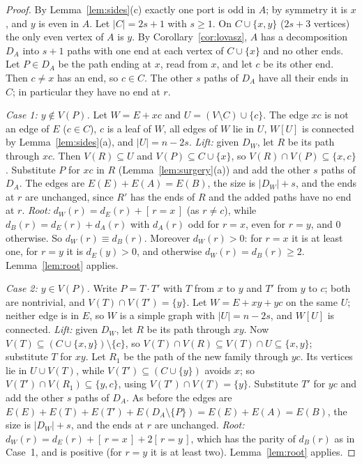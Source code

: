 \documentclass[11pt]{amsart}
\theoremstyle{definition}
\theoremstyle{remark}
\renewcommand{\_}{\oldunderscore\allowbreak}
\newcommand{\ind}[1]{[\,#1\,]}
\begin{document}
\begin{proof}
By Lemma~\ref{lem:sides}(c) exactly one port is odd in $A$; by symmetry it is $x$, and $y$ is even
in $A$. Let $|C|=2s+1$ with $s\ge1$. On $C\cup\{x,y\}$ ($2s+3$ vertices) the only even vertex of $A$
is $y$. By Corollary~\ref{cor:lovasz}, $A$ has a decomposition $D_A$ into $s+1$ paths with one end at
each vertex of $C\cup\{x\}$ and no other ends. Let $P\in D_A$ be the path ending at $x$, read from
$x$, and let $c$ be its other end. Then $c\ne x$ has an end, so $c\in C$. The other $s$ paths of
$D_A$ have all their ends in $C$; in particular they have no end at $r$.

\emph{Case 1: $y\notin V(P)$.} Let $W=E+xc$ and $U=(V\setminus C)\cup\{c\}$. The edge $xc$ is not an
edge of $E$ ($c\in C$), $c$ is a leaf of $W$, all edges of $W$ lie in $U$, $W[U]$ is connected by
Lemma~\ref{lem:sides}(a), and $|U|=n-2s$. \emph{Lift:} given $D_W$, let $R$ be its path through
$xc$. Then $V(R)\subseteq U$ and $V(P)\subseteq C\cup\{x\}$, so $V(R)\cap V(P)\subseteq\{x,c\}$.
Substitute $P$ for $xc$ in $R$ (Lemma~\ref{lem:surgery}(a)) and add the other $s$ paths of $D_A$.
The edges are $E(E)+E(A)=E(B)$, the size is $|D_W|+s$, and the ends at $r$ are unchanged, since $R'$
has the ends of $R$ and the added paths have no end at $r$. \emph{Root:} $d_W(r)=d_E(r)+\ind{r=x}$
(as $r\ne c$), while $d_B(r)=d_E(r)+d_A(r)$ with $d_A(r)$ odd for $r=x$, even for $r=y$, and $0$
otherwise. So $d_W(r)\equiv d_B(r)$. Moreover $d_W(r)>0$: for $r=x$ it is at least one, for $r=y$ it
is $d_E(y)>0$, and otherwise $d_W(r)=d_B(r)\ge2$. Lemma~\ref{lem:root} applies.

\emph{Case 2: $y\in V(P)$.} Write $P=T\cdot T'$ with $T$ from $x$ to $y$ and $T'$ from $y$ to $c$;
both are nontrivial, and $V(T)\cap V(T')=\{y\}$. Let $W=E+xy+yc$ on the same $U$; neither edge is in
$E$, so $W$ is a simple graph with $|U|=n-2s$, and $W[U]$ is connected. \emph{Lift:} given $D_W$,
let $R$ be its path through $xy$. Now $V(T)\subseteq(C\cup\{x,y\})\setminus\{c\}$, so
$V(T)\cap V(R)\subseteq V(T)\cap U\subseteq\{x,y\}$; substitute $T$ for $xy$. Let $R_1$ be the path
of the new family through $yc$. Its vertices lie in $U\cup V(T)$, while $V(T')\subseteq(C\cup\{y\})$
avoids $x$; so $V(T')\cap V(R_1)\subseteq\{y,c\}$, using $V(T')\cap V(T)=\{y\}$. Substitute $T'$ for
$yc$ and add the other $s$ paths of $D_A$. As before the edges are
$E(E)+E(T)+E(T')+E(D_A\setminus\{P\})=E(E)+E(A)=E(B)$, the size is $|D_W|+s$, and the ends at $r$ are
unchanged. \emph{Root:}
$d_W(r)=d_E(r)+\ind{r=x}+2\ind{r=y}$, which has the parity of $d_B(r)$ as in Case~1, and is
positive (for $r=y$ it is at least two). Lemma~\ref{lem:root} applies.
\end{proof}
\end{document}
